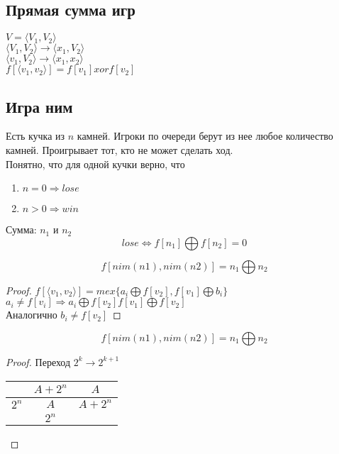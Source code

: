 \subsection{Прямая сумма игр}

$V = \langle V_1, V_2 \rangle$\\

$\langle V_1, V_2 \rangle \rightarrow \langle x_1, V_2 \rangle$\\

$\langle v_1, V_2 \rangle \rightarrow \langle x_1, x_2 \rangle$\\

$f[\langle v_1, v_2 \rangle] = f[v_1] xor f[v_2]$

\subsection{Игра ним}
Есть кучка из $n$ камней. Игроки по очереди берут из нее любое количество камней. Проигрывает тот, кто не может сделать ход.\\

Понятно, что для одной кучки верно, что
\begin{enumerate}
\item $n = 0 \Rightarrow lose$
\item $n > 0 \Rightarrow win$
\end{enumerate}

Сумма: $n_1$ и $n_2$\\
$$lose \Leftrightarrow f[n_1] \bigoplus f[n_2] = 0$$

\begin{theorem}{}
$$f[nim(n1), nim(n2)] = n_1 \bigoplus n_2$$
\end{theorem}

\begin{proof}
$f[\langle v_1, v_2 \rangle] = mex\{a_i \bigoplus f[v_2], f[v_1] \bigoplus b_i\}$\\
$a_i \neq f[v_i] \Rightarrow a_i \bigoplus f[v_2] f[v_1] \bigoplus f[v_2]$\\
Аналогично $b_i \neq f[v_2]$
\end{proof}

\begin{lemma}{}
$$f[nim(n1), nim(n2)] = n_1 \bigoplus n_2$$
\end{lemma}

\begin{proof}
Переход $2^k \rightarrow 2^{k + 1}$\\
\begin{tabular}{c|c|c|}
\hline
      & $A + 2^n$ & $A$\\
\hline
$2^n$ & $A$ & $A + 2^n$\\
\hline
      & $2^n$ &
\end{tabular}
\end{proof}

